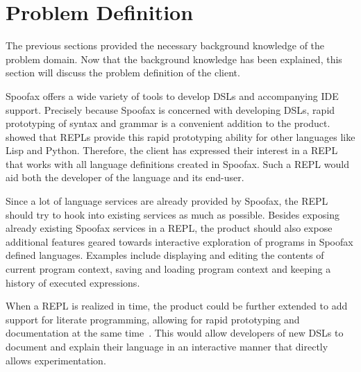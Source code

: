 \section{Problem Definition}
\label{sec:problem-definition}

The previous sections provided the necessary background knowledge of
the problem domain. Now that the background knowledge has been
explained, this section will discuss the problem definition of the
client.

Spoofax offers a wide variety of tools to develop DSLs and
accompanying IDE support. Precisely because Spoofax is concerned with
developing DSLs, rapid prototyping of syntax and grammar is a
convenient addition to the product.  showed that REPLs
provide this rapid prototyping ability for other languages like Lisp
and Python. Therefore, the client has expressed their interest in
a REPL that works with all language definitions created in
Spoofax. Such a REPL would aid both the developer of the language and
its end-user.

Since a lot of language services are already provided by Spoofax, the
REPL should try to hook into existing services as much as possible.
Besides exposing already existing Spoofax services in a REPL,
the product should also expose additional features geared
towards interactive exploration of programs in Spoofax defined
languages.  Examples include displaying and editing the contents of
current program context, saving and loading program context and
keeping a history of executed expressions.

When a REPL is realized in time, the product could be further extended to add
support for literate programming, allowing for rapid prototyping and
documentation at the same time~\cite{schulte2012}. This would allow
developers of new DSLs to document and explain their language in an
interactive manner that directly allows experimentation.

